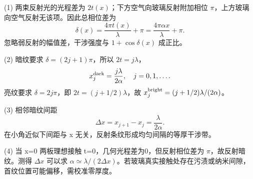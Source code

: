 (1) 两束反射光的光程差为 \(2t(x)\)；下方空气向玻璃反射附加相位 \(\pi \)，上方玻璃向空气反射无该项。因此总相位差为
\[
\delta(x)=\frac{4\pi t(x)}{\lambda}+\pi
=\frac{4\pi\alpha x}{\lambda}+\pi.
\]
忽略弱反射的幅值差，干涉强度与 \(1+\cos\delta(x)\) 成正比。

(2) 暗纹要求 \(\delta=(2j+1)\pi\)，所以 \(2t=j\lambda\)，
\[
x_j^{\rm dark}=\frac{j\lambda}{2\alpha},\quad j=0,1,\dots.
\]
亮纹要求 \(\delta=2j\pi\)，即 \(2t=(j+1/2)\lambda\)，故
\(x_j^{\rm bright}=(j+1/2)\lambda/(2\alpha)\)。

(3) 相邻暗纹间距
\[
\Delta x=x_{j+1}-x_j=\frac{\lambda}{2\alpha}.
\]
在小角近似下间距与 x 无关，反射条纹形成均匀间隔的等厚干涉带。

(4) 当 x=0 两板理想接触 t=0，几何光程差为0，但反射相位差为 \(\pi \)，故反射暗纹。测得 \(\Delta x\) 可以求 \(\alpha\simeq\lambda/(2\Delta x)\)。若玻璃真实接触处存在污渍或纳米间隙，首纹位置可能偏移，需校准零厚度。
